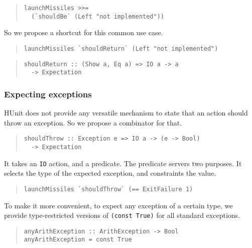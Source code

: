 \documentclass[preprint]{sigplanconf}
\begin{document}
\begin{quote}\small\begin{verbatim}
launchMissiles >>=
  (`shouldBe` (Left "not implemented"))
\end{verbatim}\end{quote}

\noindent So we propose a shortcut for this common use case.

\begin{quote}\small\begin{verbatim}
launchMissiles `shouldReturn` (Left "not implemented")
\end{verbatim}\end{quote}

\begin{quote}\small\begin{verbatim}
shouldReturn :: (Show a, Eq a) => IO a -> a
  -> Expectation
\end{verbatim}\end{quote}

\subsubsection{Expecting exceptions}

HUnit does not provide any versatile mechanism to state that an action
should throw an exception.  So we propose a combinator for that.

\begin{quote}\small\begin{verbatim}
shouldThrow :: Exception e => IO a -> (e -> Bool)
  -> Expectation
\end{verbatim}\end{quote}

\noindent It takes an {\tt IO} action, and a predicate.  The predicate
servers two purposes.  It selects the type of the expected exception,
and constraints the value.

\begin{quote}\small\begin{verbatim}
launchMissiles `shouldThrow` (== ExitFailure 1)
\end{verbatim}\end{quote}

\noindent To make it more convenient, to expect any exception of a
certain type, we provide type-restricted versions of {\tt (const
True)} for all standard exceptions.

\begin{quote}\small\begin{verbatim}
anyArithException :: ArithException -> Bool
anyArithException = const True
\end{verbatim}\end{quote}
\end{document}
